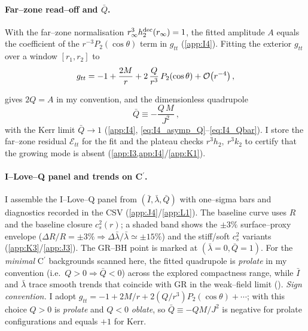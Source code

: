 \documentclass{iopjournal}
\begin{document}
\paragraph{Far–zone read–off and \(\bar Q\).}
With the far–zone normalisation \(r_\infty^{3}h_2^{\rm dec}(r_\infty)=1\), the fitted amplitude \(A\) equals the coefficient of the \(r^{-3}P_2(\cos\theta)\) term in \(g_{tt}\) (\cref{app:I4}). Fitting the exterior \(g_{tt}\) over a window \([r_1,r_2]\) to
\begin{equation}
g_{tt}=-1+\frac{2M}{r}+2\,\frac{Q}{r^{3}}\,P_{2}(\cos\theta)+\order{r^{-4}}\,,
\label{eq:12_asymp_Q}
\end{equation}

gives \(2Q=A\) in my convention, and the dimensionless quadrupole
\begin{equation}
\boxed{\ \bar{Q}\equiv-\frac{Q\,M}{J^{2}}\ } ,
\label{eq:12_Qbar}
\end{equation}
with the Kerr limit \(\bar{Q}\to1\) (\cref{app:I4}, \eqref{eq:I4_asymp_Q}–\eqref{eq:I4_Qbar}). I store the far–zone residual \(\mathcal E_{tt}\) for the fit and the plateau checks \(r^{3}h_2,\ r^{3}k_2\) to certify that the growing mode is absent (\cref{app:I3,app:I4}/\cref{app:K1}).

\paragraph{I–Love–Q panel and trends on C$^\prime$.}
I assemble the I–Love–Q panel from \((\bar{I},\bar\lambda,\bar{Q})\) with one–sigma bars and diagnostics recorded in the CSV (\cref{app:J4}/\cref{app:L1}). The baseline curve uses \(R\) and the baseline closure \(c_s^2(r)\); a shaded band shows the \(\pm3\%\) surface–proxy envelope (\(\Delta R/R=\pm3\%\Rightarrow\Delta \bar \lambda/\bar \lambda\simeq\pm15\%\)) and the stiff/soft \(c_s^2\) variants (\cref{app:K3}/\cref{app:J3}). The GR–BH point is marked at \((\bar \lambda=0,\bar{Q}=1)\). For the \emph{minimal} C$^\prime$ backgrounds scanned here, the fitted quadrupole is \emph{prolate} in my convention (i.e.\ \(Q>0\Rightarrow\bar{Q}<0\)) across the explored compactness range, while \(\bar{I}\) and \(\bar \lambda\) trace smooth trends that coincide with GR in the weak–field limit ().
\noindent\emph{Sign convention.}
I adopt $g_{tt}=-1+2M/r+2(Q/r^{3})P_2(\cos\theta)+\cdots$; with this choice $Q>0$ is \emph{prolate} and $Q<0$ \emph{oblate}, so $\bar{Q}\equiv- QM/J^{2}$ is negative for prolate configurations and equals $+1$ for Kerr.
\end{document}
